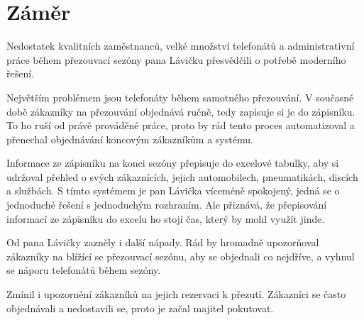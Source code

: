 \section{Záměr}
Nedostatek kvalitních zaměstnanců, velké množství telefonátů a administrativní práce během přezouvací sezóny pana Lávičku přesvědčili o potřebě moderního řešení. 

Největším problémem jsou telefonáty během samotného přezouvání. V současné době zákazníky na přezouvání objednává ručně, tedy zapisuje si je do zápisníku. To ho ruší od právě prováděné práce, proto by rád tento proces automatizoval a přenechal objednávání koncovým zákazníkům a systému.

Informace ze zápisníku na konci sezóny přepisuje do excelové tabulky, aby si udržoval přehled o svých zákaznících, jejich automobilech, pneumatikách, discích a službách. S tímto systémem je pan Lávička víceméně spokojený, jedná se o jednoduché řešení s jednoduchým rozhraním. Ale přiznává, že přepisování informací ze zápisníku do excelu ho stojí čas, který by mohl využít jinde.

Od pana Lávičky zazněly i další nápady. Rád by hromadně upozorňoval zákazníky na blížící se přezouvací sezónu, aby se objednali co nejdříve, a vyhnul se náporu telefonátů během sezóny. 

Zmínil i upozornění zákazníků na jejich rezervaci k přezutí. Zákazníci se často objednávali a nedostavili se, proto je začal majitel pokutovat.
